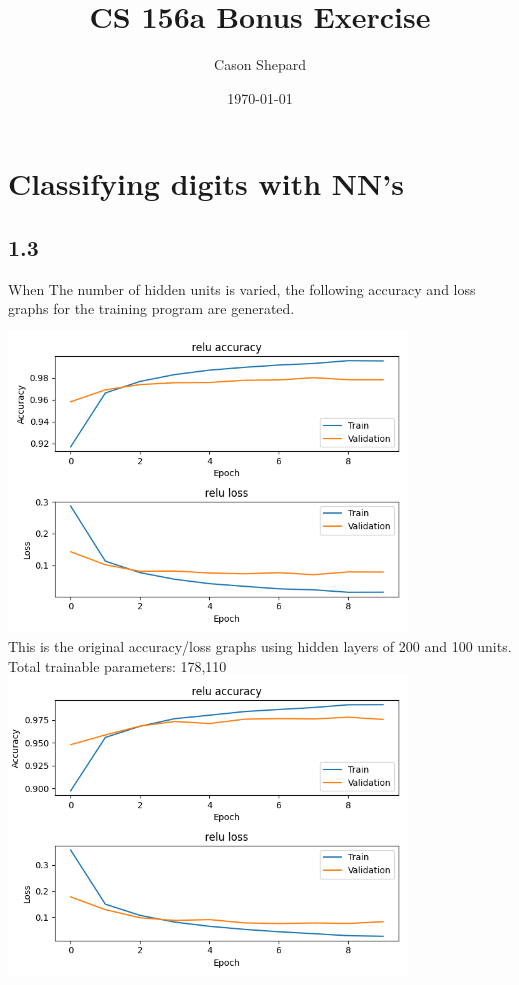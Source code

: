 \documentclass[a4paper,14pt]{extarticle}
\title{CS 156a Bonus Exercise}
\author{Cason Shepard}
\date\today
\begin{document}
\maketitle

\section{Classifying digits with NN’s}
\subsection*{1.3}
When The number of hidden units is varied, the following accuracy and loss graphs for the training program are generated.\\
\begin{center}
\includegraphics[width=400]{Figure_1_200_100_original.png}\\
This is the original accuracy/loss graphs using hidden layers of 200 and 100 units.\\Total trainable parameters: 178,110\\
\includegraphics[width=400]{Figure_1_100_50.png}\\

\end{center}
\end{document}
